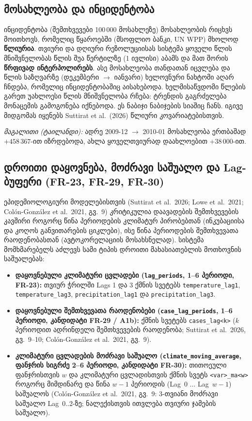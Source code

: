 \documentclass[11pt,a4paper]{article}
\begin{document}
\subsection{მოსახლეობა და ინციდენტობა}
ინციდენტობა (შემთხვევები 100\,000 მოსახლეზე) მოსახლეობის რიცხვს მოითხოვს, რომელიც წყაროებში (მსოფლიო ბანკი,
UN WPP) მხოლოდ \textbf{წლიურია}. თვიური და დღიური რეზოლუციისას სისტემა ყოველი წლის მნიშვნელობას წლის
შუა წერტილზე (1 ივლისი) აბამს და მათ შორის \textbf{წრფივად ინტერპოლირებს}. ასე მოსახლეობა თანდათან
იცვლება და წლის საზღვარზე (დეკემბერი $\rightarrow$ იანვარი) ხელოვნური ნახტომი აღარ ჩნდება, რომელიც
ინციდენტობაშიც აისახებოდა. ხელმისაწვდომი წლების გარეთ უახლოესი წლის მნიშვნელობა რჩება: ტრენდის
გაგრძელება მონაცემის გამოგონება იქნებოდა. ეს ნაბიჯი ნაბიჯების სიაშიც ჩანს. იგივე მიდგომას იყენებს
Suttirat et al.\ (2026) წლიური კოვარიატებისთვის.

\textit{მაგალითი (ტაილანდი):} ადრე 2009-12 $\rightarrow$ 2010-01 მოსახლეობა ერთბაშად $+458\,367$-ით
იზრდებოდა, ახლა ყოველთვიურად დაახლოებით $+38\,000$-ით.

\subsection{დროითი დაყოვნება, მოძრავი საშუალო და Lag-ბუფერი (FR-23, FR-29, FR-30)}
ეპიდემიოლოგიური მოდელებისთვის (Suttirat et al.\ 2026; Lowe et al.\ 2021; Col\'on-Gonz\'alez et al.\ 2021, გვ.~9)
კრიტიკულია დაავადების შემთხვევების კავშირი როგორც წინა პერიოდების კლიმატურ პირობებთან (ინკუბაციისა და კოღოს განვითარების ციკლები),
ისე წინა პერიოდების შემთხვევათა რაოდენობასთან (ავტოკორელაციის მოსახსნელად). სისტემა მომხმარებელს აძლევს სამი ტიპის დროითი მახასიათებლის მოთხოვნის საშუალებას:
\begin{itemize}[leftmargin=1.4em]
  \item \textbf{დაყოვნებული კლიმატური ცვლადები (\texttt{lag\_periods}, 1--6 პერიოდი, FR-23):}
    თვიურ ჭრილში Lags 1 და 3 ქმნის სვეტებს \texttt{temperature\_lag1}, \texttt{temperature\_lag3},
    \texttt{precipitation\_lag1} და \texttt{precipitation\_lag3}.
  \item \textbf{დაყოვნებული შემთხვევათა რაოდენობები (\texttt{case\_lag\_periods}, 1--6 პერიოდი, კანდიდატი FR-29 / A1b):}
    ქმნის სვეტებს \texttt{cases\_lag<k>} ($k$ პერიოდით ადრინდელი შემთხვევების რაოდენობა; Suttirat et al.\ 2026, გვ.~9--10; Col\'on-Gonz\'alez et al.\ 2021, გვ.~9).
  \item \textbf{კლიმატური ცვლადების მოძრავი საშუალო (\texttt{climate\_moving\_average}, ფანჯრის სიგრძე 2--6 პერიოდი, კანდიდატი FR-30):}
    თითოეული ფანჯრისთვის $w$ და კლიმატური ცვლადისთვის ქმნის სვეტს \texttt{<var>\_ma<w>} როგორც მიმდინარე და წინა $w-1$ პერიოდის (Lag~0 $\dots$ Lag~$w-1$) საშუალოს (Col\'on-Gonz\'alez et al.\ 2021, გვ.~9: 3-თვიანი მოძრავი საშუალო Lag~0..2-ზე; ნალექისთვის ითვლება თვიური ჯამების საშუალო).
\end{itemize}
\end{document}
